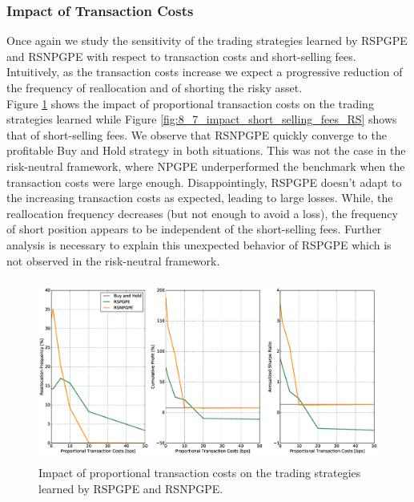 \subsubsection{Impact of Transaction Costs}
Once again we study the sensitivity of the trading strategies learned by RSPGPE and RSNPGPE with respect to transaction costs and short-selling fees. Intuitively, as the transaction costs increase we expect a progressive reduction of the frequency of reallocation and of shorting the risky asset.\\
Figure \ref{fig:8_6_impact_transaction_costs_RS} shows the impact of proportional transaction costs on the trading strategies learned while Figure \ref{fig:8_7_impact_short_selling_fees_RS} shows that of short-selling fees. We observe that RSNPGPE quickly converge to the profitable Buy and Hold strategy in both situations. This was not the case in the risk-neutral framework, where NPGPE underperformed the benchmark when the transaction costs were large enough. Disappointingly, RSPGPE doesn't adapt to the increasing transaction costs as expected, leading to large losses. While, the reallocation frequency decreases (but not enough to avoid a loss), the frequency of short position appears to be independent of the short-selling fees. Further analysis is necessary to explain this unexpected behavior of RSPGPE which is not observed in the risk-neutral framework. 

\begin{figure}[t!]
\centering
\includegraphics[height=6cm,width=1\linewidth]{Images/8_6_impact_transaction_costs_RS}
\caption[Proportional transaction costs and risk-sensitive strategies]{Impact of proportional transaction costs on the trading strategies learned by RSPGPE and RSNPGPE.}
\label{fig:8_6_impact_transaction_costs_RS}
\end{figure}

